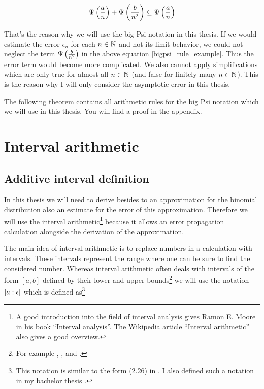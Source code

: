 \begin{align} \label{bigpsi_rule_example}
  \Psi\left( {\frac an} \right)+\Psi\left( {\frac b{n^2}} \right) \subseteq \Psi\left( {\frac an} \right)
\end{align}

That's the reason why we will use the big Psi notation in this thesis. If we would estimate the error $\epsilon_n$ for each $n\in\mathbb N$ and not its limit behavior, we could not neglect the term $\Psi\left( {\frac b{n^2}} \right)$ in the above equation \eqref{bigpsi_rule_example}. Thus the error term would become more complicated. We also cannot apply simplifications which are only true for almost all $n\in\mathbb N$ (and false for finitely many $n\in\mathbb N$). This is the reason why I will only consider the asymptotic error in this thesis.

The following theorem contains all arithmetic rules for the big Psi notation which we will use in this thesis. You will find a proof in the appendix.



\section{Interval arithmetic}

\subsection{Additive interval definition}

In this thesis we will need to derive besides to an approximation for the binomial distribution also an estimate for the error of this approximation. Therefore we will use the interval arithmetic\footnote{A good introduction into the field of interval analysis gives Ramon E. Moore in his book ``Interval analysis''\cite{moore}. The Wikipedia article ``Interval arithmetic''\cite{wikipedia:interval_arithmetic} also gives a good overview.} because it allows an error propagation calculation alongside the derivation of the approximation.

The main idea of interval arithmetic is to replace numbers in a calculation with intervals. These intervals represent the range where one can be sure to find the considered number. Whereas interval arithmetic often deals with intervals of the form $[a,b]$ defined by their lower and upper bounds\footnote{For example \cite[p.~5~ff.]{moore}, \cite[p.~9~ff.]{moore:methods}, \cite[p. 84 ff.]{kulisch} and \cite{wikipedia:interval_arithmetic}.} we will use the notation $\left[{a} : {\epsilon}\right]$ which is defined as\footnote{This notation is similar to the form (2.26) in \cite[p. 14]{moore:methods}. I also defined such a notation in my bachelor thesis \cite[p. 19]{kulla}.}

